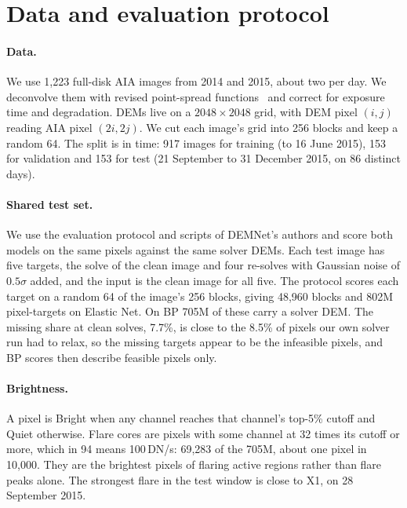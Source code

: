 \section{Data and evaluation protocol}
\label{sec:protocol}

\paragraph{Data.}
We use 1,223 full-disk AIA images from 2014 and 2015, about two per day. We deconvolve them with revised point-spread functions~\cite{hofmeister2025psf} and correct for exposure time and degradation. DEMs live on a $2048\times2048$ grid, with DEM pixel $(i,j)$ reading AIA pixel $(2i,2j)$. We cut each image's grid into 256 blocks and keep a random 64. The split is in time: 917 images for training (to 16 June 2015), 153 for validation and 153 for test (21 September to 31 December 2015, on 86 distinct days).

\paragraph{Shared test set.}
We use the evaluation protocol and scripts of DEMNet's authors and score both models on the same pixels against the same solver DEMs. Each test image has five targets, the solve of the clean image and four re-solves with Gaussian noise of $0.5\sigma$ added, and the input is the clean image for all five. The protocol scores each target on a random 64 of the image's 256 blocks, giving 48,960 blocks and 802M pixel-targets on Elastic Net. On BP 705M of these carry a solver DEM. The missing share at clean solves, 7.7\%, is close to the 8.5\% of pixels our own solver run had to relax, so the missing targets appear to be the infeasible pixels, and BP scores then describe feasible pixels only.

\paragraph{Brightness.}
A pixel is Bright when any channel reaches that channel's top-5\% cutoff and Quiet otherwise. Flare cores are pixels with some channel at 32 times its cutoff or more, which in 94\Ang{} means 100\,DN/s: 69,283 of the 705M, about one pixel in 10,000. They are the brightest pixels of flaring active regions rather than flare peaks alone. The strongest flare in the test window is close to X1, on 28 September 2015.

